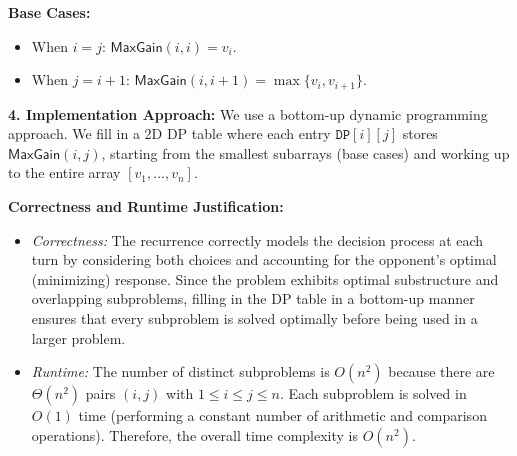 \documentclass[11pt]{article}
\begin{document}
        \textbf{Base Cases:}  
        \begin{itemize}
            \item When \(i = j\): \(\mathsf{MaxGain}(i,i) = v_i\).
            \item When \(j = i+1\): \(\mathsf{MaxGain}(i,i+1) = \max\{v_i, v_{i+1}\}\).
        \end{itemize}
        
        \bigskip
        
        \textbf{4. Implementation Approach:}  
        We use a bottom-up dynamic programming approach. We fill in a 2D DP table where each entry \(\texttt{DP}[i][j]\) stores \(\mathsf{MaxGain}(i,j)\), starting from the smallest subarrays (base cases) and working up to the entire array \([v_1,\dots,v_n]\).
        
        \bigskip
        
        \textbf{Correctness and Runtime Justification:}  
        \begin{itemize}
            \item \emph{Correctness:}  
            The recurrence correctly models the decision process at each turn by considering both choices and accounting for the opponent’s optimal (minimizing) response. Since the problem exhibits optimal substructure and overlapping subproblems, filling in the DP table in a bottom-up manner ensures that every subproblem is solved optimally before being used in a larger problem.
            
            \item \emph{Runtime:}  
            The number of distinct subproblems is \(O(n^2)\) because there are \(\Theta(n^2)\) pairs \((i,j)\) with \(1 \leq i \leq j \leq n\). Each subproblem is solved in \(O(1)\) time (performing a constant number of arithmetic and comparison operations). Therefore, the overall time complexity is \(O(n^2)\).
        \end{itemize}

    \newpage

    
    
\end{document}
